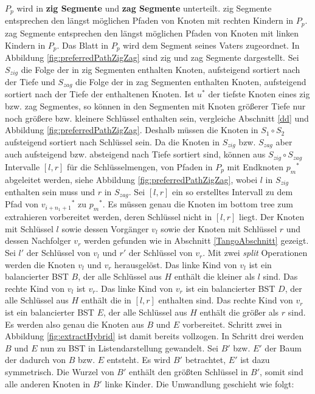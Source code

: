 \documentclass[a4paper,12pt]{article}
\begin{document}
$P_p$ wird in \textbf{zig Segmente} und \textbf{zag Segmente} unterteilt.  zig Segmente entsprechen den längst möglichen Pfaden von Knoten mit rechten Kindern in $P_p$. zag Segmente entsprechen den längst möglichen Pfaden von Knoten mit linken Kindern in $P_p$. Das Blatt in $P_p$ wird dem Segment seines Vaters zugeordnet. In Abbildung  \ref{fig:preferredPathZigZag} sind zig und zag Segmente dargestellt.  Sei $S_{zig}$ die Folge der in zig Segmenten enthalten Knoten, aufsteigend sortiert nach der Tiefe und $S_{zag}$ die Folge der in zag Segmenten enthalten Knoten, aufsteigend sortiert nach der Tiefe der enthaltenen Knoten. Ist $u^*$ der tiefste Knoten eines zig bzw. zag Segmentes, so können in den Segmenten mit Knoten größerer Tiefe nur noch größere bzw. kleinere Schlüssel enthalten sein, vergleiche Abschnitt \ref{dd} und Abbildung \ref{fig:preferredPathZigZag}. Deshalb müssen die Knoten in $S_1 \circ S_2$ aufsteigend sortiert nach Schlüssel sein. Da die Knoten in $S_{zig}$ bzw. $S_{zag}$ aber auch aufsteigend bzw. absteigend nach Tiefe sortiert sind, können aus $S_{zig} \circ S_{zag}$ Intervalle $\left[l, r\right]$ für die Schlüsselmengen, von Pfaden in $P_p$ mit Endknoten ${p_m}^*$ abgeleitet werden, siehe Abbildung \ref{fig:preferredPathZigZag}, wobei $l$ in $S_{zig}$ enthalten sein muss und $r$ in $S_{zag}$.  Sei $\left[l,r\right]$ ein so erstelltes Intervall zu dem Pfad von ${v_{i + {n_1} + 1}}^*$ zu ${p_m}^*$. Es müssen genau die Knoten im bottom tree zum extrahieren vorbereitet werden, deren Schlüssel nicht in $\left[l, r\right]$ liegt. Der Knoten mit Schlüssel $l$ sowie dessen Vorgänger $v_l$ sowie der Knoten mit Schlüssel $r$ und dessen Nachfolger $v_r$ werden gefunden wie in Abschnitt \ref{TangoAbschnitt} gezeigt. Sei $l'$ der Schlüssel von $v_l$ und $r'$ der Schlüssel von $v_r$. Mit zwei \textit{split} Operationen werden die Knoten $v_l$ und $v_r$ herausgelöst. Das linke Kind von $v_l$ ist ein balancierter BST $B$, der alle Schlüssel aus $H$ enthält die kleiner als $l$ sind. Das rechte Kind von $v_l$ ist $v_r$. Das linke Kind von $v_r$ ist ein balancierter BST $D$, der alle Schlüssel aus $H$ enthält die in $\left[l, r\right]$ enthalten sind.  Das rechte  Kind von $v_r$ ist ein balancierter BST $E$, der alle Schlüssel aus $H$ enthält die größer als $r$ sind. Es werden also genau die Knoten aus $B$ und $E$ vorbereitet. Schritt zwei in Abbildung \ref{fig:extractHybrid} ist damit bereits vollzogen. In Schritt drei werden $B$ und $E$ nun zu BST in Listendarstellung gewandelt. Sei $B'$ bzw. $E'$ der Baum der dadurch von $B$ bzw. $E$ entsteht. Es wird $B'$ betrachtet, $E'$ ist dazu symmetrisch.  Die Wurzel von $B'$ enthält den größten Schlüssel in $B'$, somit sind alle anderen Knoten in $B'$ linke Kinder. Die Umwandlung geschieht wie folgt:\\
\end{document}
